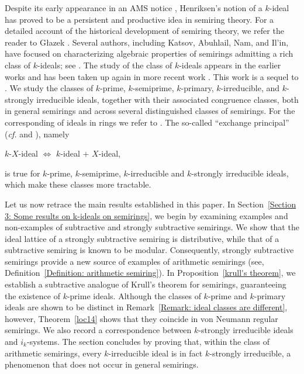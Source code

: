 \documentclass[11pt,leqno]{amsart}
\theoremstyle{definition}
\numberwithin{equation}{section}
\begin{document}
Despite its early appearance in an AMS notice \cite{Henriksen58}, Henriksen’s notion of a $k$-ideal has proved to be a persistent and productive idea in semiring theory. For a detailed account of the historical development of semiring theory, we refer the reader to G\l azek \cite{Glazek02}. Several authors, including Katsov, Abuhlail, Nam, and Il'in, have focused on characterizing algebraic properties of semirings admitting a rich class of $k$-ideals; see \cite{Il'inKatsovNam17, Abuhlail22, Abuhlail18, Katsov09, Katsov11}.
The study of the class of $k$-ideals appears in the earlier works \cite{LaTorre65, SenAdhikari92, SenAdhikari93, Han15, Han21, JunRayTolliver22, WeinertSenAdhikari96} and has been taken up again in more recent work \cite{GoswamiDube24}. This work is a sequel to \cite{GoswamiDube24}. We study the classes of $k$-prime, $k$-semiprime, $k$-primary, $k$-irreducible, and $k$-strongly irreducible ideals, together with their associated congruence classes, both in general semirings and across several distinguished classes of semirings. For the corresponding of ideals in rings we refer to \cite{AtiyahMacdonald, Azizi08, Schwartz16}.
The so-called ``exchange principal'' (\textit{cf.}\cite[Proposition 3.5]{JunRayTolliver22} and \cite[Proposition 3.11, Proposition 3.21]{GoswamiDube24}), namely
\begin{center}
 $k$-$X$-ideal $\iff $ $k$-ideal $+$ $X$-ideal,   
\end{center}
is true for $k$-prime, $k$-semiprime, $k$-irreducible and $k$-strongly irreducible ideals, which make these classes more tractable. 

Let us now retrace the main results established in this paper. 
In Section~\ref{Section 3: Some results on k-ideals on semirings}, we begin by examining examples and non-examples of subtractive and strongly subtractive semirings. We show that the ideal lattice of a strongly subtractive semiring is distributive, while that of a subtractive semiring is known to be modular. Consequently, strongly subtractive semirings provide a new source of examples of arithmetic semirings (see, Definition~\ref{Definition: arithmetic semiring}). In Proposition~\ref{krull's theorem}, we establish a subtractive analogue of Krull’s theorem for semirings, guaranteeing the existence of $k$-prime ideals. Although the classes of $k$-prime and $k$-primary ideals are shown to be distinct in Remark~\ref{Remark: ideal classes are different}, however, Theorem~\ref{loc14} shows that they coincide in von Neumann regular semirings. We also record a correspondence between $k$-strongly irreducible ideals and $i_k$-systems. The section concludes by proving that, within the class of arithmetic semirings, every $k$-irreducible ideal is in fact $k$-strongly irreducible, a phenomenon that does not occur in general semirings. 
\end{document}
